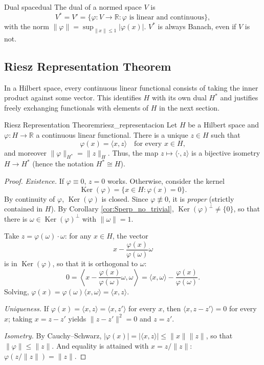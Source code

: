 \documentclass[11pt, a4paper]{article}
\begin{document}
\begin{definicion}{Dual space}{dual}
The dual of a normed space $V$ is
$$ V^* = V' = \{ \varphi: V \to \mathbb{R} : \varphi \text{ is linear and continuous} \}, $$
with the norm $\|\varphi\| = \sup_{\|x\| \le 1} |\varphi(x)|$. $V^*$ is always Banach, even if $V$
is not.
\end{definicion}

\subsection{Riesz Representation Theorem}

In a Hilbert space, every continuous linear functional consists of taking the inner product against some
vector. This identifies $H$ with its own dual $H^*$ and justifies freely exchanging functionals
with elements of $H$ in the next section.

\begin{teorema}{Riesz Representation Theorem}{riesz_representacion}
Let $H$ be a Hilbert space and $\varphi: H \to \mathbb{R}$ a continuous linear functional. There is a unique
$z \in H$ such that
$$ \varphi(x) = \langle x, z \rangle \quad \text{for every } x \in H, $$
and moreover $\|\varphi\|_{H^*} = \|z\|_H$. Thus, the map
$z \mapsto \langle \cdot, z \rangle$ is a bijective isometry $H \to H^*$ (hence the
notation $H^* \cong H$).
\end{teorema}

\begin{proof}
\textit{Existence.} If $\varphi \equiv 0$, $z = 0$ works. Otherwise, consider the kernel
$$ \operatorname{Ker}(\varphi) = \{ x \in H : \varphi(x) = 0 \}. $$
By continuity of $\varphi$, $\operatorname{Ker}(\varphi)$ is closed.
Since $\varphi \not\equiv 0$, it is \emph{proper} (strictly contained in $H$).
By Corollary \ref{cor:Sperp_no_trivial}, $\operatorname{Ker}(\varphi)^\perp \ne \{0\}$,
so that there is $\omega \in \operatorname{Ker}(\varphi)^\perp$ with $\|\omega\| = 1$.

Take $z = \varphi(\omega) \cdot \omega$: for any $x \in H$, the vector
$$ x - \frac{\varphi(x)}{\varphi(\omega)} \omega $$
is in $\operatorname{Ker}(\varphi)$, so that it is orthogonal to
$\omega$:
$$ 0 = \left\langle x - \frac{\varphi(x)}{\varphi(\omega)} \omega, \omega \right\rangle = \langle x,
\omega \rangle - \frac{\varphi(x)}{\varphi(\omega)}. $$
Solving, $\varphi(x) = \varphi(\omega) \langle x, \omega \rangle = \langle x, z \rangle$.

\textit{Uniqueness.} If $\varphi(x) = \langle x, z \rangle = \langle x, z' \rangle$ for every $x$,
then $\langle x, z - z' \rangle = 0$ for every $x$; taking $x = z - z'$ yields
$\|z - z'\|^2 = 0$ and $z = z'$.

\textit{Isometry.} By Cauchy--Schwarz, $|\varphi(x)| = |\langle x, z \rangle| \le \|x\| \|z\|$,
so that $\|\varphi\| \le \|z\|$. And equality is attained with $x = z/\|z\|$:
$\varphi(z/\|z\|) = \|z\|$.
\end{proof}
\end{document}
